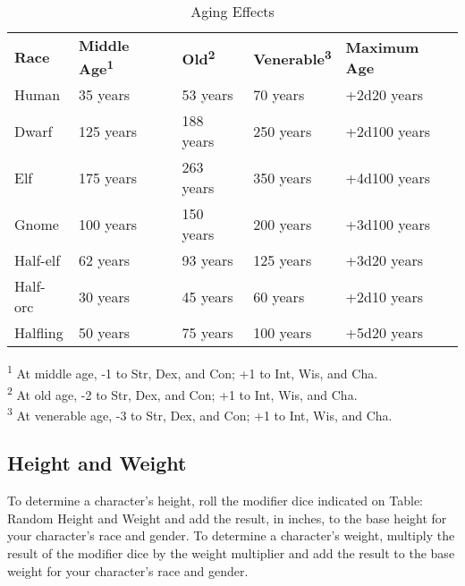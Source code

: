 \begin{table}[htb]
\sffamily
{}
\setlength{\tabcolsep}{1pt}
\caption{Aging Effects}
\begin{tabular}{lllll}
\textbf{Race} & \textbf{Middle Age\textsuperscript{1}} & \textbf{Old\textsuperscript{2}} & \textbf{Venerable\textsuperscript{3}} & \textbf{Maximum Age}\\
Human & 35 years & 53 years & 70 years & +2d20 years\\
Dwarf & 125 years & 188 years & 250 years & +2d100 years\\
Elf & 175 years & 263 years & 350 years & +4d100 years\\
Gnome & 100 years & 150 years & 200 years & +3d100 years\\
Half-elf & 62 years & 93 years & 125 years & +3d20 years\\
Half-orc & 30 years & 45 years & 60 years & +2d10 years\\
Halfling & 50 years & 75 years & 100 years & +5d20 years\\
\end{tabular}
\textsuperscript{1} At middle age, -1 to Str, Dex, and Con; +1 to Int, Wis, and Cha.\\
\textsuperscript{2} At old age, -2 to Str, Dex, and Con; +1 to Int, Wis, and Cha.\\
\textsuperscript{3} At venerable age, -3 to Str, Dex, and Con; +1 to Int, Wis, and Cha.\\
\end{table}

\subsection{Height and Weight}

				
To determine a character's height, roll the modifier dice indicated on Table: Random Height and Weight and add the result, in inches, to the base height for your character's race and gender. To determine a character's weight, multiply the result of the modifier dice by the weight multiplier and add the result to the base weight for your character's race and gender.
				
